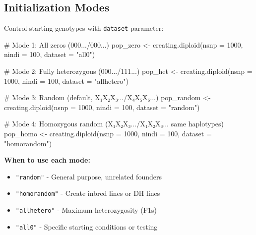 \documentclass[
  letterpaper,
]{book}
\newenvironment{Shaded}{\begin{snugshade}}{\end{snugshade}}
\newcommand{\AttributeTok}[1]{\textcolor[rgb]{0.40,0.45,0.13}{#1}}
\newcommand{\CommentTok}[1]{\textcolor[rgb]{0.37,0.37,0.37}{#1}}
\newcommand{\DecValTok}[1]{\textcolor[rgb]{0.68,0.00,0.00}{#1}}
\newcommand{\FunctionTok}[1]{\textcolor[rgb]{0.28,0.35,0.67}{#1}}
\newcommand{\NormalTok}[1]{\textcolor[rgb]{0.00,0.23,0.31}{#1}}
\newcommand{\OtherTok}[1]{\textcolor[rgb]{0.00,0.23,0.31}{#1}}
\newcommand{\StringTok}[1]{\textcolor[rgb]{0.13,0.47,0.30}{#1}}
\providecommand{\tightlist}{%
  \setlength{\itemsep}{0pt}\setlength{\parskip}{0pt}}
\begin{document}
\subsection{Initialization Modes}\label{initialization-modes}

Control starting genotypes with \texttt{dataset} parameter:

\begin{Shaded}
\begin{Highlighting}[]
\CommentTok{\# Mode 1: All zeros (000.../000...)}
\NormalTok{pop\_zero }\OtherTok{\textless{}{-}} \FunctionTok{creating.diploid}\NormalTok{(}\AttributeTok{nsnp =} \DecValTok{1000}\NormalTok{, }\AttributeTok{nindi =} \DecValTok{100}\NormalTok{,}
                              \AttributeTok{dataset =} \StringTok{"all0"}\NormalTok{)}

\CommentTok{\# Mode 2: Fully heterozygous (000.../111...)}
\NormalTok{pop\_het }\OtherTok{\textless{}{-}} \FunctionTok{creating.diploid}\NormalTok{(}\AttributeTok{nsnp =} \DecValTok{1000}\NormalTok{, }\AttributeTok{nindi =} \DecValTok{100}\NormalTok{,}
                             \AttributeTok{dataset =} \StringTok{"allhetero"}\NormalTok{)}

\CommentTok{\# Mode 3: Random (default, X₁X₂X₃.../X₄X₅X₆...)}
\NormalTok{pop\_random }\OtherTok{\textless{}{-}} \FunctionTok{creating.diploid}\NormalTok{(}\AttributeTok{nsnp =} \DecValTok{1000}\NormalTok{, }\AttributeTok{nindi =} \DecValTok{100}\NormalTok{,}
                                \AttributeTok{dataset =} \StringTok{"random"}\NormalTok{)}

\CommentTok{\# Mode 4: Homozygous random (X₁X₂X₃.../X₁X₂X₃... same haplotypes)}
\NormalTok{pop\_homo }\OtherTok{\textless{}{-}} \FunctionTok{creating.diploid}\NormalTok{(}\AttributeTok{nsnp =} \DecValTok{1000}\NormalTok{, }\AttributeTok{nindi =} \DecValTok{100}\NormalTok{,}
                              \AttributeTok{dataset =} \StringTok{"homorandom"}\NormalTok{)}
\end{Highlighting}
\end{Shaded}

\textbf{When to use each mode:}

\begin{itemize}
\tightlist
\item
  \texttt{"random"} - General purpose, unrelated founders
\item
  \texttt{"homorandom"} - Create inbred lines or DH lines
\item
  \texttt{"allhetero"} - Maximum heterozygosity (F1s)
\item
  \texttt{"all0"} - Specific starting conditions or testing
\end{itemize}
\end{document}
